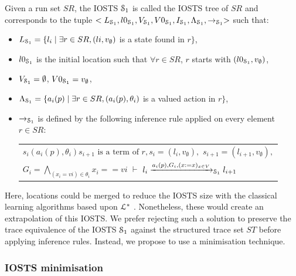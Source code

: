 \begin{definition}
\label{IOSTS_tree}
Given a run set $SR$, the IOSTS $\EuScript{S}_1$ is called the
IOSTS tree of $SR$ and corresponds to the tuple
$<L_{\EuScript{S}_1}, l0_{\EuScript{S}_1},V_{\EuScript{S}_1},
V0_{\EuScript{S}_1}, I_{\EuScript{S}_1},
\Lambda_{\EuScript{S}_1},\rightarrow_{\EuScript{S}_1}>$ such
that:

\begin{itemize}

\item $L_{\EuScript{S}_1}= \{l_i \mid \exists r\in SR, (li,v_\emptyset)$ is
a state found in $r\}$,

\item $l0_{\EuScript{S}_1}$ is the initial location such that $\forall r \in
SR$, $r$ starts with $(l0_{\EuScript{S}_1},v_\emptyset)$,

\item $V_{\EuScript{S}_1}=\emptyset$, $V0_{\EuScript{S}_1}=v_\emptyset$,

\item $\Lambda_{\EuScript{S}_1}= \{a_i(p) \mid \exists r\in SR,
(a_i(p),\theta_i)$ is a valued action in $r\}$,

\item $\rightarrow_{\EuScript{S}_1}$ is defined by the following inference
rule applied on every element $r\in SR$:

\begin{tabular}{l}
$s_i (a_i(p),\theta_i) s_{i+1} \text{ is a term
of } r, s_i=(l_i,v_\emptyset),$
$s_{i+1}=(l_{i+1},v_\emptyset),$\\$ G_i=\displaystyle \bigwedge_{(x_i=vi)\in \theta_i} x_i==vi$
$\vdash$ $l_i \xrightarrow{a_i(p),G_i,(x:=x)_{x\in V}}_{\EuScript{S}_1} l_{i+1}$
\end{tabular}

\end{itemize}
\end{definition}

Here, locations could be merged to reduce the IOSTS size with the
classical learning algorithms based upon $\EuScript{L}^*$
\cite{Angluin198787,lambeau08}. Nonetheless, these would create
an extrapolation of this IOSTS. We prefer rejecting such a
solution to preserve the trace equivalence of the IOSTS
$\EuScript{S}_1$ against the structured trace set $ST$ before
applying inference rules. Instead, we propose to use a
minimisation technique.

\subsubsection{IOSTS minimisation}


